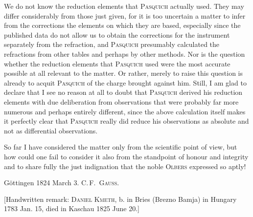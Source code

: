 We do not know the reduction elements that \textsc{Pasquich} actually used.
They may differ considerably from those just given, for it is too uncertain
a matter to infer from the corrections  the elements on which
they are based, especially since the published data do not allow us to obtain
the corrections for the instrument separately from the refraction, and
\textsc{Pasquich} presumably calculated the refractions from other tables
and perhaps by other methods. Nor is the question whether the reduction elements
that \textsc{Pasquich} used were the most accurate possible at all relevant to
the matter. Or rather, merely to raise this question is already to acquit
\textsc{Pasquich} of the charge brought against him. Still, I am glad to declare
that I see no reason at all to doubt that \textsc{Pasquich} derived his reduction
elements with due deliberation from observations that were probably far more
numerous and perhaps entirely different, since the above calculation itself
makes it perfectly clear that \textsc{Pasquich} really did reduce his observations
as absolute and not as differential observations.

So far I have considered the matter only from the scientific point of view,
but how could one fail to consider it also from the standpoint of honour and
integrity and to share fully the just indignation that the noble \textsc{Olbers}
expressed so aptly!

\noindent Göttingen 1824 March 3. \hfill C.\,F.\ \textsc{Gauss}.

[Handwritten remark: \textsc{Daniel Kmeth}, b. in Bries (Brezno Bamja) in Hungary 1783 Jan. 15, died in Kaschau 1825 June 20.]
